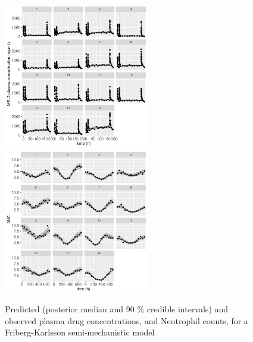\documentclass[11pt]{amsart}
\begin{document}
\begin{figure}[htbp]
\includegraphics[width=2.5in,trim=0in 0in 0 0in]{graphics/neutropenia/neutropeniaPopulation1TorstenPlots010.pdf}
\includegraphics[width=2.5in,trim=0in 0in 0 0in]{graphics/neutropenia/neutropeniaPopulation1TorstenPlots011.pdf}
\caption{{Predicted (posterior median and 90 \% credible intervals) and observed plasma drug concentrations, and Neutrophil counts, for a Friberg-Karlsson semi-mechanistic model}}
\label{FKPredictions}
\end{figure}
 
\end{document}
